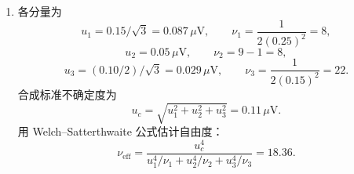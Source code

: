 \documentclass[UTF8,12pt,a4paper]{ctexart}
\begin{document}
\begin{enumerate}[label=\arabic*、]
\item 各分量为
\begin{equation*}
    u_1=0.15/\sqrt{3}=0.087\,\mu\mathrm{V},\qquad
    \nu_1=\frac{1}{2(0.25)^2}=8,
\end{equation*}
\begin{equation*}
    u_2=0.05\,\mu\mathrm{V},\qquad \nu_2=9-1=8,
\end{equation*}
\begin{equation*}
    u_3=(0.10/2)/\sqrt{3}=0.029\,\mu\mathrm{V},\qquad
    \nu_3=\frac{1}{2(0.15)^2}=22.
\end{equation*}
合成标准不确定度为
\begin{equation*}
    u_c=\sqrt{u_1^2+u_2^2+u_3^2}=0.11\,\mu\mathrm{V}.
\end{equation*}
用 Welch--Satterthwaite 公式估计自由度：
\begin{equation*}
    \nu_{\mathrm{eff}}=\frac{u_c^4}{u_1^4/\nu_1+u_2^4/\nu_2+u_3^4/\nu_3}=18.36.
\end{equation*}
\end{enumerate}
\end{document}
